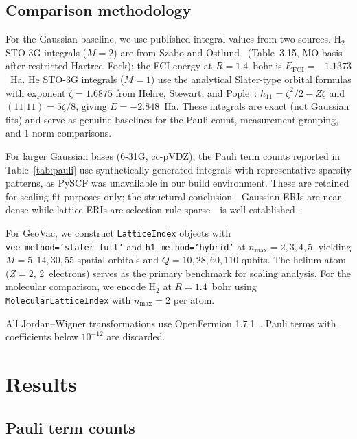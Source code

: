 \documentclass[aps,pra,twocolumn,superscriptaddress,longbibliography]{revtex4-2}
\begin{document}
\subsection{Comparison methodology}
\label{sec:comparison}

For the Gaussian baseline, we use published integral values from two
sources.  H$_2$ STO-3G integrals ($M = 2$) are from Szabo and
Ostlund~\cite{szabo1996} (Table~3.15, MO basis after restricted
Hartree--Fock); the FCI energy at $R = 1.4$~bohr is
$E_{\mathrm{FCI}} = -1.1373$~Ha.  He STO-3G integrals ($M = 1$) use
the analytical Slater-type orbital formulas with exponent
$\zeta = 1.6875$ from Hehre, Stewart, and Pople~\cite{hehre1969}:
$h_{11} = \zeta^2/2 - Z\zeta$ and $(11|11) = 5\zeta/8$, giving
$E = -2.848$~Ha.  These integrals are exact (not Gaussian fits) and
serve as genuine baselines for the Pauli count, measurement grouping,
and 1-norm comparisons.

For larger Gaussian bases (6-31G, cc-pVDZ), the Pauli term counts
reported in Table~\ref{tab:pauli} use synthetically generated integrals
with representative sparsity patterns, as PySCF was unavailable in our
build environment.  These are retained for scaling-fit purposes only;
the structural conclusion---Gaussian ERIs are near-dense while lattice
ERIs are selection-rule-sparse---is well established~\cite{helgaker2000}.

For GeoVac, we construct \texttt{LatticeIndex} objects with
\texttt{vee\_method='slater\_full'} and \texttt{h1\_method='hybrid'} at
$n_{\max} = 2, 3, 4, 5$, yielding $M = 5, 14, 30, 55$ spatial orbitals
and $Q = 10, 28, 60, 110$ qubits.  The helium atom ($Z = 2$, 2~electrons)
serves as the primary benchmark for scaling analysis.  For the molecular
comparison, we encode H$_2$ at $R = 1.4$~bohr using
\texttt{MolecularLatticeIndex} with $n_{\max} = 2$ per atom.

All Jordan--Wigner transformations use OpenFermion
1.7.1~\cite{mcclean2020}.  Pauli terms with coefficients below $10^{-12}$
are discarded.


\section{Results}
\label{sec:results}

\subsection{Pauli term counts}
\label{sec:pauli_counts}
\end{document}
